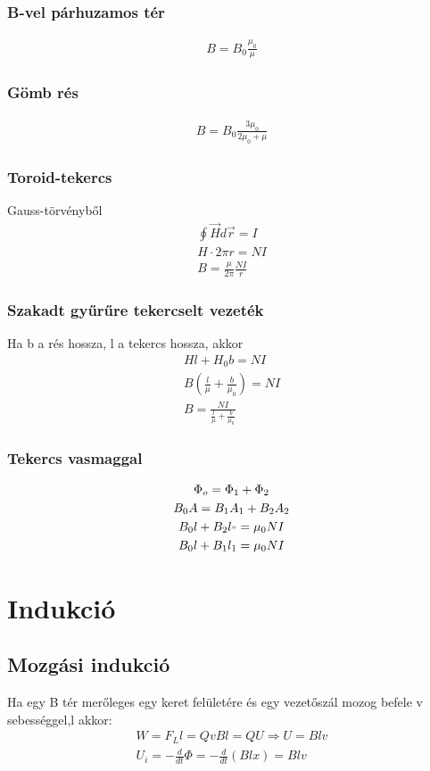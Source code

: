 \documentclass{article}
\begin{document}
\subsubsection{B-vel párhuzamos tér}
\begin{gather*}
B=B_0 \frac{\mu_0}{\mu}
\end{gather*}
\subsubsection{Gömb rés}
\begin{gather*}
B=B_0 \frac{3\mu_0}{2\mu_0+\mu}
\end{gather*}
\subsubsection{Toroid-tekercs}
Gauss-törvényből
\begin{gather*}
\oint \vec{H} d\vec{r} = I \\
H \cdot 2\pi r = NI \\
B=\frac{\mu}{2\pi} \frac{NI}{r}
\end{gather*}
\subsubsection{Szakadt gyűrűre tekercselt vezeték}
Ha b a rés hossza, l a tekercs hossza, akkor
\begin{gather*}
Hl + H_0 b = NI \\
B\left( \frac{l}{\mu} + \frac{b}{\mu_0} \right) = NI \\
B = \frac{NI}{\frac{l}{\mu} + \frac{b}{\mu_0}}
\end{gather*}
\subsubsection{Tekercs vasmaggal}
\begin{gather*}
\Phi_o = \Phi_1 + \Phi_2 \\
B_0 A = B_1 A_1 + B_2 A_2 \\
B_0 l + B_2 l_" = \mu_0 N I \\
B_0 l + B_1 l_1 = \mu_0 N I \\
\end{gather*}
\newpage
\section{Indukció}
\subsection{Mozgási indukció}
Ha egy B tér merőleges egy keret felületére és egy vezetőszál mozog befele v sebességgel,l akkor:
\begin{gather*}
W=F_L l = QvBl = QU \Rightarrow U=Blv \\
U_i = -\frac{d}{dt} \Phi = -\frac{d}{dt}(Blx) = Blv
\end{gather*}
\end{document}
